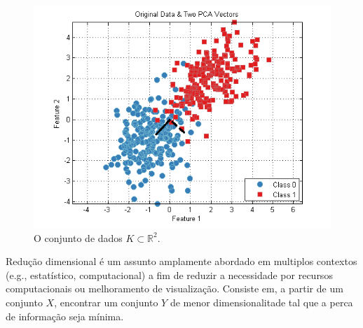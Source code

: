 \documentclass{article}
\begin{document}
	\begin{figure}[H]
		\centering
		\captionsetup{justification=centering}
		
		\includegraphics[width=.8\linewidth]{assets/k}
		\caption{O conjunto de dados $K \subset \mathbb{R}^2$.}
		\label{fig:datasetk}
	\end{figure}
	
	Redução dimensional é um assunto amplamente abordado em multiplos contextos (e.g., estatístico, computacional) a fim de reduzir a necessidade por recursos computacionais ou melhoramento de visualização. Consiste em, a partir de um conjunto $X$, encontrar um conjunto $Y$ de menor dimensionalitade tal que a perca de informação seja mínima.
	
\end{document}
